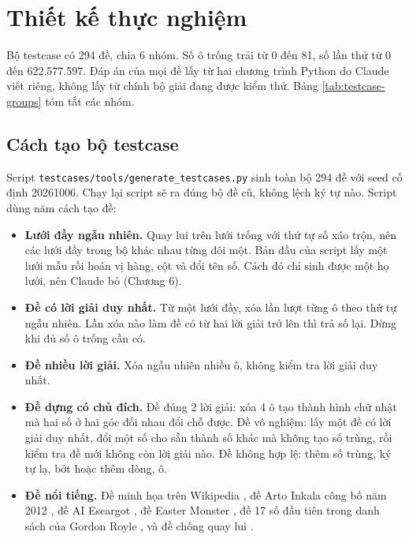 \chapter{Thiết kế thực nghiệm}

Bộ testcase có 294 đề, chia 6 nhóm. Số ô trống trải từ 0 đến 81, số lần thử từ 0 đến 622.577.597. Đáp án của mọi đề lấy từ hai chương trình Python do Claude viết riêng, không lấy từ chính bộ giải đang được kiểm thử. Bảng \ref{tab:testcase-groups} tóm tắt các nhóm.

\begin{table}[H]
  \centering
  \caption{Các nhóm testcase và kết quả lần chạy ngày 12/10/2026, kể cả 2 đề chậm}
  \label{tab:testcase-groups}
  \small
  
\end{table}

\section{Cách tạo bộ testcase}

Script \texttt{testcases/tools/generate\_testcases.py} sinh toàn bộ 294 đề với seed cố định 20261006. Chạy lại script sẽ ra đúng bộ đề cũ, không lệch ký tự nào. Script dùng năm cách tạo đề:

\begin{itemize}
  \item \textbf{Lưới đầy ngẫu nhiên.} Quay lui trên lưới trống với thứ tự số xáo trộn, nên các lưới đầy trong bộ khác nhau từng đôi một. Bản đầu của script lấy một lưới mẫu rồi hoán vị hàng, cột và đổi tên số. Cách đó chỉ sinh được một họ lưới, nên Claude bỏ (Chương 6).
  \item \textbf{Đề có lời giải duy nhất.} Từ một lưới đầy, xóa lần lượt từng ô theo thứ tự ngẫu nhiên. Lần xóa nào làm đề có từ hai lời giải trở lên thì trả số lại. Dừng khi đủ số ô trống cần có.
  \item \textbf{Đề nhiều lời giải.} Xóa ngẫu nhiên nhiều ô, không kiểm tra lời giải duy nhất.
  \item \textbf{Đề dựng có chủ đích.} Đề đúng 2 lời giải: xóa 4 ô tạo thành hình chữ nhật mà hai số ở hai góc đối nhau đổi chỗ được. Đề vô nghiệm: lấy một đề có lời giải duy nhất, đổi một số cho sẵn thành số khác mà không tạo số trùng, rồi kiểm tra đề mới không còn lời giải nào. Đề không hợp lệ: thêm số trùng, ký tự lạ, bớt hoặc thêm dòng, ô.
  \item \textbf{Đề nổi tiếng.} Đề minh họa trên Wikipedia \cite{wikipedia-sudoku}, đề Arto Inkala công bố năm 2012 \cite{sudokuwiki-inkala}, đề AI Escargot \cite{sudokuwiki-escargot}, đề Easter Monster \cite{sudokusnake-easter-monster}, đề 17 số đầu tiên trong danh sách của Gordon Royle \cite{wikipedia-sudoku-math}, và đề chống quay lui \cite{wikipedia-sudoku-algorithms}.
\end{itemize}

